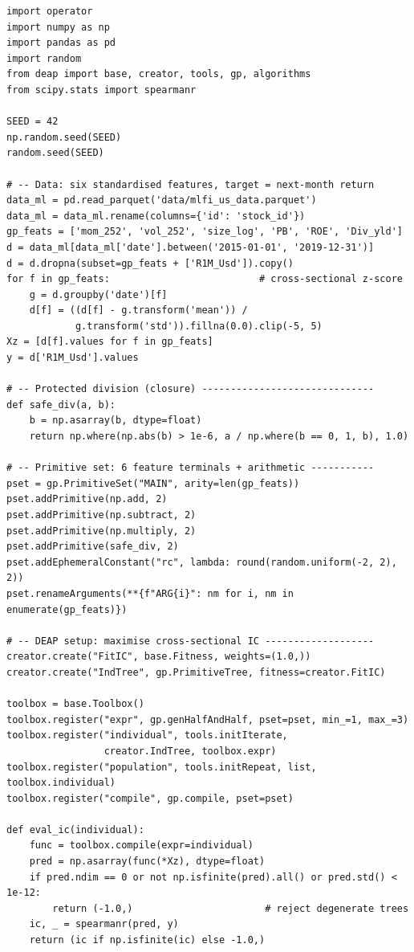 \begin{verbatim}
import operator
import numpy as np
import pandas as pd
import random
from deap import base, creator, tools, gp, algorithms
from scipy.stats import spearmanr

SEED = 42
np.random.seed(SEED)
random.seed(SEED)

# -- Data: six standardised features, target = next-month return
data_ml = pd.read_parquet('data/mlfi_us_data.parquet')
data_ml = data_ml.rename(columns={'id': 'stock_id'})
gp_feats = ['mom_252', 'vol_252', 'size_log', 'PB', 'ROE', 'Div_yld']
d = data_ml[data_ml['date'].between('2015-01-01', '2019-12-31')]
d = d.dropna(subset=gp_feats + ['R1M_Usd']).copy()
for f in gp_feats:                          # cross-sectional z-score
    g = d.groupby('date')[f]
    d[f] = ((d[f] - g.transform('mean')) /
            g.transform('std')).fillna(0.0).clip(-5, 5)
Xz = [d[f].values for f in gp_feats]
y = d['R1M_Usd'].values

# -- Protected division (closure) ------------------------------
def safe_div(a, b):
    b = np.asarray(b, dtype=float)
    return np.where(np.abs(b) > 1e-6, a / np.where(b == 0, 1, b), 1.0)

# -- Primitive set: 6 feature terminals + arithmetic -----------
pset = gp.PrimitiveSet("MAIN", arity=len(gp_feats))
pset.addPrimitive(np.add, 2)
pset.addPrimitive(np.subtract, 2)
pset.addPrimitive(np.multiply, 2)
pset.addPrimitive(safe_div, 2)
pset.addEphemeralConstant("rc", lambda: round(random.uniform(-2, 2), 2))
pset.renameArguments(**{f"ARG{i}": nm for i, nm in enumerate(gp_feats)})

# -- DEAP setup: maximise cross-sectional IC -------------------
creator.create("FitIC", base.Fitness, weights=(1.0,))
creator.create("IndTree", gp.PrimitiveTree, fitness=creator.FitIC)

toolbox = base.Toolbox()
toolbox.register("expr", gp.genHalfAndHalf, pset=pset, min_=1, max_=3)
toolbox.register("individual", tools.initIterate,
                 creator.IndTree, toolbox.expr)
toolbox.register("population", tools.initRepeat, list, toolbox.individual)
toolbox.register("compile", gp.compile, pset=pset)

def eval_ic(individual):
    func = toolbox.compile(expr=individual)
    pred = np.asarray(func(*Xz), dtype=float)
    if pred.ndim == 0 or not np.isfinite(pred).all() or pred.std() < 1e-12:
        return (-1.0,)                       # reject degenerate trees
    ic, _ = spearmanr(pred, y)
    return (ic if np.isfinite(ic) else -1.0,)


\end{verbatim}
